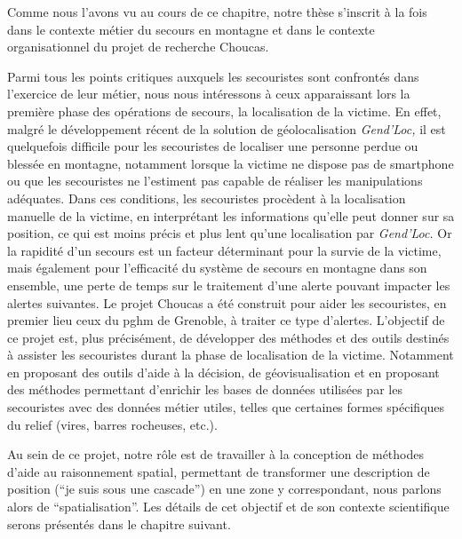 Comme nous l'avons vu au cours de ce chapitre, notre thèse s'inscrit à
la fois dans le contexte métier du secours en montagne et dans
le contexte organisationnel du projet de recherche Choucas.

Parmi tous les points critiques auxquels les secouristes sont
confrontés dans l'exercice de leur métier, nous nous intéressons à
ceux apparaissant lors la première phase des opérations de secours, la
localisation de la victime. En effet, malgré le développement récent
de la solution de géolocalisation \emph{Gend'Loc,} il est quelquefois
difficile pour les secouristes de localiser une personne perdue ou
blessée en montagne, notamment lorsque la victime ne dispose pas de
smartphone ou que les secouristes ne l'estiment pas capable de
réaliser les manipulations adéquates. Dans ces conditions, les
secouristes procèdent à la localisation manuelle de la victime, en
interprétant les informations qu'elle peut donner sur sa position, ce
qui est moins précis et plus lent qu'une localisation par
\emph{Gend'Loc.} Or la rapidité d'un secours est un facteur
déterminant pour la survie de la victime, mais également pour
l'efficacité du système de secours en montagne dans son ensemble, une
perte de temps sur le traitement d'une alerte pouvant impacter les
alertes suivantes. Le projet Choucas a été construit pour aider les
secouristes, en premier lieu ceux du \ac{pghm} de Grenoble, à traiter
ce type d'alertes. L'objectif de ce projet est, plus précisément, de
développer des méthodes et des outils destinés à assister les
secouristes durant la phase de localisation de la victime. Notamment
en proposant des outils d'aide à la décision, de géovisualisation et
en proposant des méthodes permettant d'enrichir les bases de données
utilisées par les secouristes avec des données métier utiles, telles
que certaines formes spécifiques du relief (\eg vires, barres
rocheuses, etc.).

Au sein de ce projet, notre rôle est de travailler à la conception de
méthodes d'aide au raisonnement spatial, permettant de transformer une
description de position (\eg \enquote{je suis sous une cascade}) en
une zone y correspondant, nous parlons alors de
\enquote{spatialisation}. Les détails de cet objectif et de son
contexte scientifique serons présentés dans le chapitre suivant.

